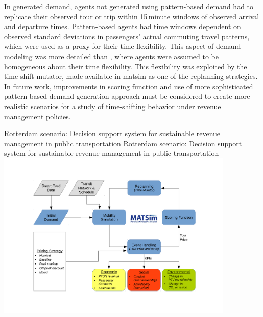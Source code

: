 In generated demand, agents not generated using pattern-based demand had to replicate their observed tour or trip within 15\,minute windows of observed arrival and departure times. Pattern-based agents had time windows dependent on observed standard deviations in passengers' actual commuting travel patterns, which were used as a proxy for their time flexibility. This aspect of demand modeling was more detailed than \citet[][]{LovricEtAl_DSS_2013}, where agents were assumed to be homogeneous about their time flexibility. This flexibility was exploited by the time shift mutator, made available in \gls{matsim} as one of the \gls{replanning} strategies. In future work, improvements in scoring function and use of more sophisticated pattern-based demand generation approach must be considered to create more realistic scenarios for a study of time-shifting behavior under revenue management policies.

\createfigure%
{Rotterdam scenario: Decision support system for sustainable revenue management in public transportation}%
{Rotterdam scenario: Decision support system for sustainable revenue management in public transportation}%
{\label{fig:rotterdam}}%
{\includegraphics[width=0.85\textwidth, angle=0]{./scenarios/figures/rotterdam}}%
{}


